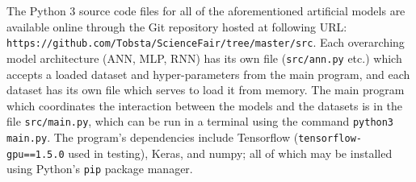 \documentclass[]{report}
\begin{document}
The Python 3 source code files for all of the aforementioned artificial models are available online through the Git repository hosted at following URL: \texttt{https://github.com/Tobsta/ScienceFair/tree/master/src}. Each overarching model architecture (ANN, MLP, RNN) has its own file (\texttt{src/ann.py} etc.) which accepts a loaded dataset and hyper-parameters from the main program, and each dataset has its own file which serves to load it from memory. The main program which coordinates the interaction between the models and the datasets is in the file \texttt{src/main.py}, which can be run in a terminal using the command \texttt{python3 main.py}. The program's dependencies include Tensorflow (\texttt{tensorflow-gpu==1.5.0} used in testing), Keras, and numpy; all of which may be installed using Python's \texttt{pip} package manager.

\twocolumn
\label{sec:Glossary}
\end{document}
